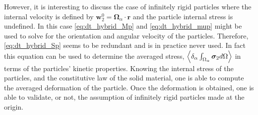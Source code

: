 However, it is interesting to discuss the case of infinitely rigid particles where the internal velocity is defined by $\textbf{w}_2^0 = \bm\Omega_\alpha \cdot \textbf{r}$ and the particle internal stress is undefined. 
In this case \ref{eq:dt_hybrid_Mp} and \ref{eq:dt_hybrid_mup} might be used to solve for the orientation and angular velocity of the particles. 
Therefore, \ref{eq:dt_hybrid_Sp} seems to be redundant and is in practice never used. 
In fact this equation can be used to determine the averaged stress, $\left<\delta_\alpha \int_{\Omega_\alpha} \bm{\sigma}_2 d\Omega\right>$ in terms of the particles' kinetic properties. 
Knowing the internal stress of the particles, and the constitutive law of the solid material, one is able to compute the averaged deformation of the particle. 
Once the deformation is obtained, one is able to validate, or not, the assumption of infinitely rigid particles made at the origin. 


